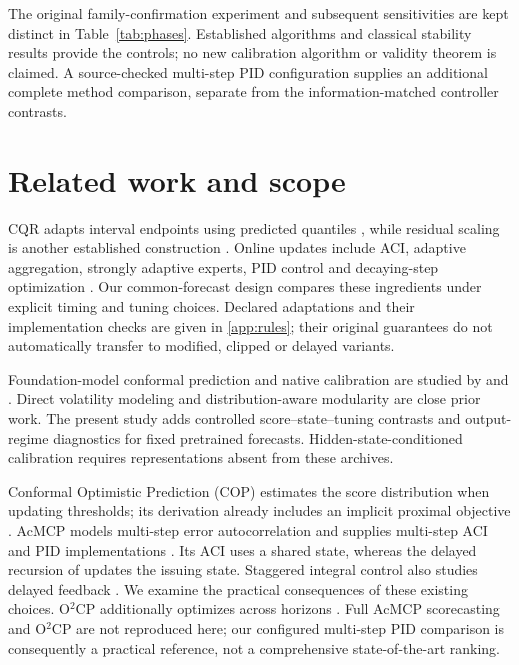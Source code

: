 \documentclass[preprint,11pt]{elsarticle}
\begin{document}
The original family-confirmation experiment and subsequent sensitivities are kept
distinct in Table~\ref{tab:phases}. Established algorithms and classical stability
results provide the controls; no new calibration algorithm or validity theorem is
claimed. A source-checked multi-step PID configuration supplies an additional complete
method comparison, separate from the information-matched controller contrasts.

\section{Related work and scope}
CQR adapts interval endpoints using predicted quantiles \citep{romano2019cqr}, while
residual scaling is another established construction \citep{lei2018distfree}. Online
updates include ACI, adaptive aggregation, strongly adaptive experts, PID control and
decaying-step optimization \citep{gibbs2021aci,zaffran2022acits,gibbs2024dtaci,
bhatnagar2023saocp,angelopoulos2023pid,angelopoulos2024decay,areces2025online}.
Our common-forecast design compares these ingredients under explicit timing and
tuning choices. Declared adaptations and their implementation checks are given in
\ref{app:rules}; their original guarantees do not automatically transfer to modified,
clipped or delayed variants.

Foundation-model conformal prediction and native calibration are studied by
\citet{achour2025fm} and \citet{adler2025calibration}. Direct volatility modeling
\citep{cho2026volatility} and distribution-aware modularity \citep{schweizer2026dcp}
are close prior work. The present study adds controlled score--state--tuning contrasts
and output-regime diagnostics for fixed pretrained forecasts. Hidden-state-conditioned
calibration \citep{zhu2025afocp} requires representations absent from these archives.

Conformal Optimistic Prediction (COP) estimates the score distribution when updating
thresholds; its derivation already includes an implicit proximal objective
\citep{hu2026cop}. AcMCP models multi-step error autocorrelation and supplies multi-step
ACI and PID implementations \citep{wang2026acmcp}. Its ACI uses a shared state, whereas
the delayed recursion of \citet{elhalabi2026delayed} updates the issuing state.
Staggered integral control also studies delayed feedback \citep{cherenson2026staggered}.
We examine the practical consequences of these existing choices. O$^2$CP additionally
optimizes across horizons \citep{li2026o2cp}. Full AcMCP scorecasting and O$^2$CP are
not reproduced here; our configured multi-step PID comparison is consequently a
practical reference, not a comprehensive state-of-the-art ranking.
\end{document}
